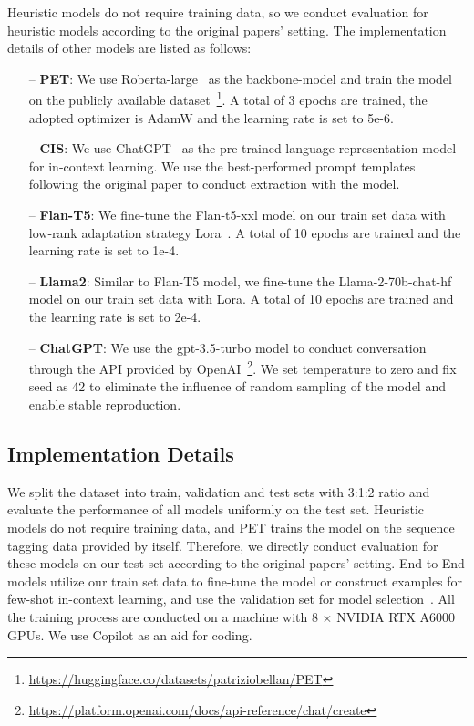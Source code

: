 \label{app:ModelDetails}
Heuristic models do not require training data, so we conduct evaluation for heuristic models according to the original papers' setting. The implementation details of other models are listed as follows:

\begin{enumerate}
    \item[--] \textbf{PET}: We use Roberta-large~\cite{liu2019roberta} as the backbone-model and train the model on the publicly available dataset~\footnote{\url{https://huggingface.co/datasets/patriziobellan/PET}}. A total of 3 epochs are trained, the adopted optimizer is AdamW and the learning rate is set to 5e-6.

    \item[--] \textbf{CIS}: We use ChatGPT~\cite{ouyang2022training} as the pre-trained language representation model for in-context learning. We use the best-performed prompt templates following the original paper to conduct extraction with the model.

    \item[--] \textbf{Flan-T5}: We fine-tune the Flan-t5-xxl model on our train set data with low-rank adaptation strategy Lora~\cite{hu2021lora}. A total of 10 epochs are trained and the learning rate is set to 1e-4.

    \item[--] \textbf{Llama2}: Similar to Flan-T5 model, we fine-tune the Llama-2-70b-chat-hf model on our train set data with Lora. A total of 10 epochs are trained and the learning rate is set to 2e-4.

    \item[--] \textbf{ChatGPT}: We use the gpt-3.5-turbo model to conduct conversation through the API provided by OpenAI~\footnote{\url{https://platform.openai.com/docs/api-reference/chat/create}}.
    We set temperature to zero and fix seed as 42 to eliminate the influence of random sampling of the model and enable stable reproduction.
\end{enumerate}


\subsection{Implementation Details
}

\label{app:Implementation}
We split the dataset into train, validation and test sets with 3:1:2 ratio and evaluate the performance of all models uniformly on the test set. Heuristic models do not require training data, and PET trains the model on the sequence tagging data provided by itself. Therefore, we directly conduct evaluation for these models on our test set according to the original papers' setting. End to End models utilize our train set data to fine-tune the model or construct examples for few-shot in-context learning, and use the validation set for model selection~\cite{raschka2018model}.
All the training process are conducted on a machine with $8$ $\times$ NVIDIA RTX A6000 GPUs. We use Copilot as an aid for coding.

